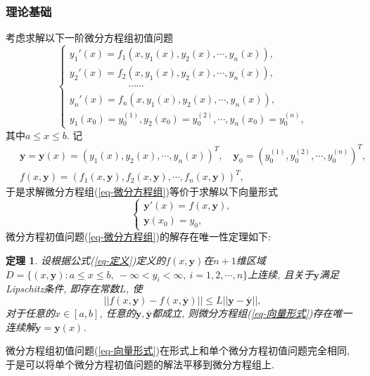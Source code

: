 \documentclass[12pt, a4paper, oneside]{ctexart}
\newtheorem{theorem}{定理} %
\numberwithin{equation}{section}  %
\let\leq=\leqslant %
\def\bd{\boldsymbol}        %
\def\ol{\overline}          %
\begin{document}
\subsubsection{理论基础}
考虑求解以下一阶微分方程组初值问题
\begin{equation}\label{eq-微分方程组}
\begin{cases}
    y_1'(x) = f_1(x,y_1(x), y_2(x), \cdots, y_n(x)),\\
    y_2'(x) = f_2(x,y_1(x), y_2(x), \cdots, y_n(x)),\\
    \qquad\qquad\qquad\cdots\cdots\\
    y_n'(x) = f_n(x,y_1(x), y_2(x), \cdots, y_n(x)),\\
    y_1(x_0) = y_0^{(1)}, y_2(x_0) = y_0^{(2)}, \cdots, y_n(x_0) = y_0^{(n)},
\end{cases}
\end{equation}
其中$a\leq x\leq b$. 记
\begin{equation}\label{eq-定义}
    \begin{aligned}
        &\ \bd{y} = \bd{y}(x) = (y_1(x),y_2(x),\cdots, y_n(x))^T,\quad \bd{y}_0 = (y_0^{(1)}, y_0^{(2)},\cdots, y_0^{(n)})^T,\\
        &\ f(x,\bd{y}) = (f_1(x, \bd{y}), f_2(x, \bd{y}), \cdots, f_n(x,\bd{y}))^T,
    \end{aligned}
\end{equation}
于是求解微分方程组(\ref{eq-微分方程组})等价于求解以下向量形式
\begin{equation}\label{eq-向量形式}
    \begin{cases}
        \bd{y}'(x) = f(x,\bd{y}),\\
        \bd{y}(x_0) = y_0,
    \end{cases}
\end{equation}
微分方程初值问题(\ref{eq-微分方程组})的解存在唯一性定理如下:
\begin{theorem}
    设根据公式(\ref{eq-定义})定义的$f(x,\bd{y})$在$n+1$维区域$D=\{(x, \bd{y}):a\leq x \leq b,\ -\infty < y_i < \infty,\ i=1,2,\cdots,n\}$上连续, 且关于$\bd{y}$满足Lipschitz条件, 即存在常数$L$, 使
    \begin{equation}
        ||f(x, \bd{y}) - f(x, \ol{\bd{y}})||\leq L||\bd{y}-\ol{\bd{y}}||,
    \end{equation}
    对于任意的$x\in[a, b]$, 任意的$\bd{y},\ol{\bd{y}}$都成立, 则微分方程组(\ref{eq-向量形式})存在唯一连续解$\bd{y} = \bd{y}(x)$.
\end{theorem}
微分方程组初值问题(\ref{eq-向量形式})在形式上和单个微分方程初值问题完全相同, 于是可以将单个微分方程初值问题的解法平移到微分方程组上. 
\end{document}
